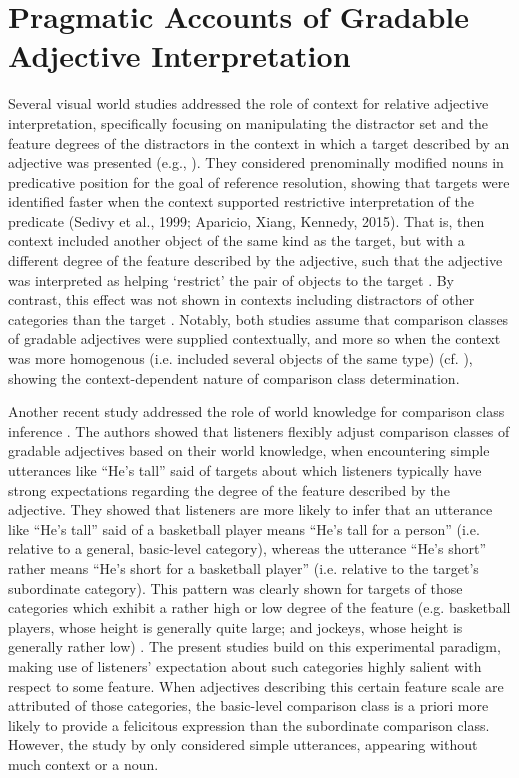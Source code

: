 \section{Pragmatic Accounts of Gradable Adjective Interpretation}
Several visual world studies addressed the role of context for relative adjective interpretation, specifically focusing on manipulating the distractor set and the feature degrees of the distractors in the context in which a target described by an adjective was presented (e.g., \cite{sedivy1999, Aparicio2015}). 
They considered prenominally modified nouns in predicative position for the goal of reference resolution, showing that targets were identified faster when the context supported restrictive interpretation of the predicate (Sedivy et al., 1999; Aparicio, Xiang, Kennedy, 2015). That is, then context included another object of the same kind as the target, but with a different degree of the feature described by the adjective, such that the adjective was interpreted as helping ‘restrict’ the pair of objects to the target . By contrast, this effect was not shown in contexts including distractors of other categories than the target \parencite{Aparicio2015}. 
Notably, both studies assume that comparison classes of gradable adjectives were supplied contextually, and more so when the context was more homogenous (i.e. included several objects of the same type) (cf. \cite{Aparicio2015}), showing the context-dependent nature of comparison class determination. 

Another recent study addressed the role of world knowledge for comparison class inference \parencite{tessler2017warm}. The authors showed that listeners flexibly adjust comparison classes of gradable adjectives based on their world knowledge, when encountering simple utterances like “He’s tall” said of targets about which listeners typically have strong expectations regarding the degree of the feature described by the adjective. They showed that listeners are more likely to infer that an utterance like “He’s tall” said of a basketball player means “He’s tall for a person” (i.e. relative to a general, basic-level category), whereas the utterance “He’s short” rather means “He’s short for a basketball player” (i.e. relative to the target’s subordinate category). This pattern was clearly shown for targets of those categories which exhibit a rather high or low degree of the feature (e.g. basketball players, whose height is generally quite large; and jockeys, whose height is generally rather low) \parencite{tessler2017warm}. 
The present studies build on this experimental paradigm, making use of listeners’ expectation about such categories highly salient with respect to some feature. When adjectives describing this certain feature scale are attributed of those categories, the basic-level comparison class is a priori more likely to provide a felicitous expression than the subordinate comparison class. 
However, the study by \cite{tessler2017warm} only considered simple utterances, appearing without much context or a noun. 
